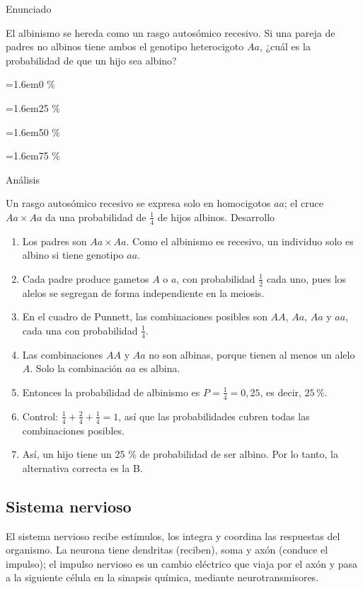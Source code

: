 \documentclass[10pt,a4paper,twocolumn]{article}
\newcommand{\alternativa}[2]{\par\noindent\hangindent=1.6em\hangafter=1\makebox[1.6em][l]{\tecla{#1}}#2\par}
\newcommand{\clave}[1]{\par\smallskip{\sffamily\footnotesize\color{esmeralda} Clave \teclaok{#1}}\par}
\begin{document}
\begin{ejemplo}
{\sffamily\footnotesize\color{zinc500} Enunciado}\par
El albinismo se hereda como un rasgo autosómico recesivo. Si una pareja de padres no albinos tiene ambos el genotipo heterocigoto $Aa$, ¿cuál es la probabilidad de que un hijo sea albino?
\alternativa{A}{0 \%}
\alternativa{B}{25 \%}
\alternativa{C}{50 \%}
\alternativa{D}{75 \%}
\clave{B}
{\sffamily\footnotesize\color{zinc500} Análisis}\par Un rasgo autosómico recesivo se expresa solo en homocigotos $aa$; el cruce $Aa \times Aa$ da una probabilidad de $\frac{1}{4}$ de hijos albinos.
{\sffamily\footnotesize\color{zinc500} Desarrollo}
\begin{enumerate}
  \item Los padres son $Aa \times Aa$. Como el albinismo es recesivo, un individuo solo es albino si tiene genotipo $aa$.
  \item Cada padre produce gametos $A$ o $a$, con probabilidad $\frac{1}{2}$ cada uno, pues los alelos se segregan de forma independiente en la meiosis.
  \item En el cuadro de Punnett, las combinaciones posibles son $AA$, $Aa$, $Aa$ y $aa$, cada una con probabilidad $\frac{1}{4}$.
  \item Las combinaciones $AA$ y $Aa$ no son albinas, porque tienen al menos un alelo $A$. Solo la combinación $aa$ es albina.
  \item Entonces la probabilidad de albinismo es $P = \frac{1}{4} = 0{,}25$, es decir, $25\,\%$.
  \item Control: $\frac{1}{4} + \frac{2}{4} + \frac{1}{4} = 1$, así que las probabilidades cubren todas las combinaciones posibles.
  \item Así, un hijo tiene un 25 \% de probabilidad de ser albino. Por lo tanto, la alternativa correcta es la B.
\end{enumerate}
\end{ejemplo}

\subsection{Sistema nervioso}

El sistema nervioso recibe estímulos, los integra y coordina las respuestas del organismo. La neurona tiene dendritas (reciben), soma y axón (conduce el impulso); el impulso nervioso es un cambio eléctrico que viaja por el axón y pasa a la siguiente célula en la sinapsis química, mediante neurotransmisores.
\end{document}
